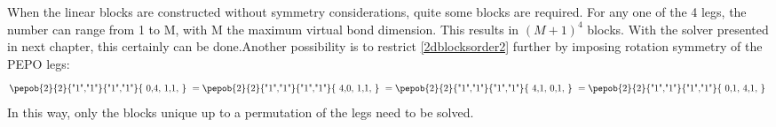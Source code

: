 When the linear blocks are constructed without symmetry considerations, quite some blocks are required. For any one of the 4 legs, the number can range from 1 to M, with M the maximum virtual bond dimension. This results in $(M+1)^4$ blocks. With the solver presented in next chapter, this certainly can be done.Another possibility is to restrict \cref{2dblocksorder2} further by imposing rotation symmetry of the PEPO legs:
\begin{equation}
    \vcenter{ \hbox{\pepob{2}{2}{{"1","1"}}{{"1","1"}}{{
                        0,4,
                        1,1,
                    }} } } =     \vcenter{ \hbox{\pepob{2}{2}{{"1","1"}}{{"1","1"}}{{
                        4,0,
                        1,1,
                    }} } } = \vcenter{ \hbox{\pepob{2}{2}{{"1","1"}}{{"1","1"}}{{
                        4,1,
                        0,1,
                    }} } }= \vcenter{ \hbox{\pepob{2}{2}{{"1","1"}}{{"1","1"}}{{
                        0,1,
                        4,1,
                    }} } }
\end{equation}
In this way, only the blocks unique up to a permutation of the legs need to be solved.

